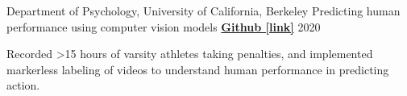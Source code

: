 \begin{cventries}
    
    
  \cventry
   	{Department of Psychology, University of California, Berkeley}
    {Predicting human performance using computer vision models} %
    {\href{https://github.com/maedbhk/action_prediction}{\textbf{Github [link]}}}
    {2020} %
    {
      \begin{cvitems} %
      	\item {Recorded >15 hours of varsity athletes taking penalties, and implemented markerless labeling of videos to understand human performance in predicting action.}
      \end{cvitems}
    }   
    

\end{cventries}
